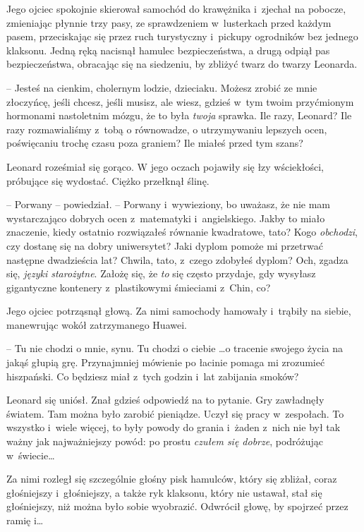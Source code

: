 \documentclass[oneside,polish,11pt,rmheadings]{mwbk}
\begin{document}
Jego ojciec spokojnie skierował samochód do krawężnika i~zjechał na pobocze, zmieniając płynnie trzy pasy, ze sprawdzeniem w~lusterkach przed każdym pasem, przeciskając się przez ruch turystyczny i~pickupy ogrodników bez jednego klaksonu. Jedną ręką nacisnął hamulec bezpieczeństwa, a drugą odpiął pas bezpieczeństwa, obracając się na siedzeniu, by zbliżyć twarz do twarzy Leonarda. 


-- Jesteś na cienkim, cholernym lodzie, dzieciaku. Możesz zrobić ze mnie złoczyńcę, jeśli chcesz, jeśli musisz, ale wiesz, gdzieś w~tym twoim przyćmionym hormonami nastoletnim mózgu, że to była \textit{twoja }sprawka. Ile razy, Leonard? Ile razy rozmawialiśmy z~tobą o równowadze, o utrzymywaniu lepszych ocen, poświęcaniu trochę czasu poza graniem? Ile miałeś przed tym szans? 


Leonard roześmiał się gorąco. W jego oczach pojawiły się łzy wściekłości, próbujące się wydostać. Ciężko przełknął ślinę. 

-- Porwany -- powiedział. -- Porwany i~wywieziony, bo uważasz, że nie mam wystarczająco dobrych ocen z~matematyki i~angielskiego. Jakby to miało znaczenie, kiedy ostatnio rozwiązałeś równanie kwadratowe, tato? Kogo \textit{obchodzi}, czy dostanę się na dobry uniwersytet? Jaki dyplom pomoże mi przetrwać następne dwadzieścia lat? Chwila, tato, z~czego zdobyłeś dyplom? Och, zgadza się, \textit{języki starożytne}. Założę się, że \textit{to} się często przydaje, gdy wysyłasz gigantyczne kontenery z~plastikowymi śmieciami z~Chin, co? 


Jego ojciec potrząsnął głową. Za nimi samochody hamowały i~trąbiły na siebie, manewrując wokół zatrzymanego Huawei.

 -- Tu nie chodzi o mnie, synu. Tu chodzi o ciebie \ldots  o tracenie swojego życia na jakąś głupią grę. Przynajmniej mówienie po łacinie pomaga mi zrozumieć hiszpański. Co będziesz miał z~tych godzin i~lat zabijania smoków? 


Leonard się uniósł. Znał gdzieś odpowiedź na to pytanie. Gry zawładnęły światem. Tam można było zarobić pieniądze. Uczył się pracy w~zespołach. To wszystko i~wiele więcej, to były powody do grania i~żaden z~nich nie był tak ważny jak najważniejszy powód: po prostu \textit{czułem się dobrze}, podróżując w~świecie\ldots  


Za nimi rozległ się szczególnie głośny pisk hamulców, który się zbliżał, coraz głośniejszy i~głośniejszy, a także ryk klaksonu, który nie ustawał, stał się głośniejszy, niż można było sobie wyobrazić. Odwrócił głowę, by spojrzeć przez ramię i\ldots  
\end{document}
